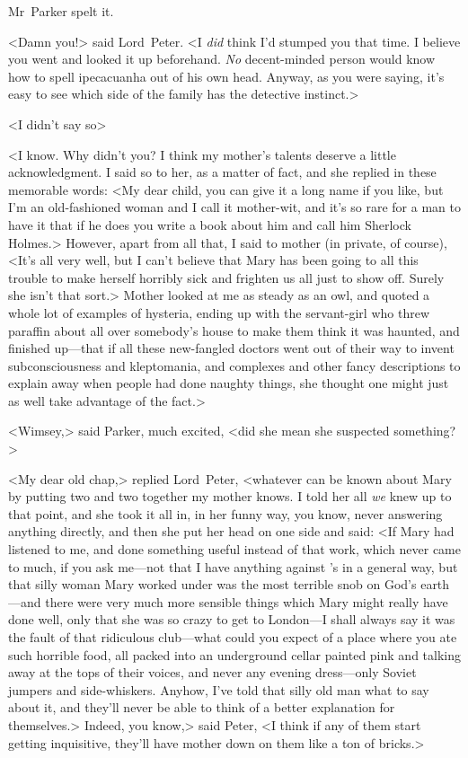 Mr~Parker spelt it.

<Damn you!> said Lord~Peter. <I \emph{did} think I'd stumped you that time.  I believe you went and looked it up beforehand. \emph{No} decent-minded person would know how to spell ipecacuanha out of his own head. Anyway, as you were saying, it's easy to see which side of the family has the detective instinct.>

<I didn't say so\longdash>

<I know. Why didn't you? I think my mother's talents deserve a little acknowledgment. I said so to her, as a matter of fact, and she replied in these memorable words: <My dear child, you can give it a long name if you like, but I'm an old-fashioned woman and I call it mother-wit, and it's so rare for a man to have it that if he does you write a book about him and call him Sherlock Holmes.> However, apart from all that, I said to mother (in private, of course), <It's all very well, but I can't believe that Mary has been going to all this trouble to make herself horribly sick and frighten us all just to show off. Surely she isn't that sort.> Mother looked at me as steady as an owl, and quoted a whole lot of examples of hysteria, ending up with the servant-girl who threw paraffin about all over somebody's house to make them think it was haunted, and finished up—that if all these new-fangled doctors went out of their way to invent subconsciousness and kleptomania, and complexes and other fancy descriptions to explain away when people had done naughty things, she thought one might just as well take advantage of the fact.>

<Wimsey,> said Parker, much excited, <did she mean she suspected something?>

<My dear old chap,> replied Lord~Peter, <whatever can be known about Mary by putting two and two together my mother knows. I told her all \emph{we} knew up to that point, and she took it all in, in her funny way, you know, never answering anything directly, and then she put her head on one side and said: <If Mary had listened to me, and done something useful instead of that  work, which never came to much, if you ask me—not that I have anything against 's in a general way, but that silly woman Mary worked under was the most terrible snob on God's earth—and there were very much more sensible things which Mary might really have done well, only that she was so crazy to get to London—I shall always say it was the fault of that ridiculous club—what could you expect of a place where you ate such horrible food, all packed into an underground cellar painted pink and talking away at the tops of their voices, and never any evening dress—only Soviet jumpers and side-whiskers. Anyhow, I've told that silly old man what to say about it, and they'll never be able to think of a better explanation for themselves.> Indeed, you know,> said Peter, <I think if any of them start getting inquisitive, they'll have mother down on them like a ton of bricks.>

